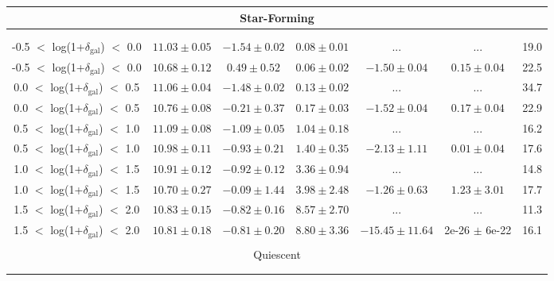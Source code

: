 \documentclass[a4paper,fleqn,usenatbib]{mnras}
\begin{document}
\begin{table*}
\begin{center}
\begin{tabular}{ccccccc}
	\multicolumn{7}{c}{Star-Forming} \\[-0.5mm]
	\hline \\[-5mm]
	\hline \\[-3mm]


    -0.5 $<$ log(1+$\delta_{\mathrm{gal}}$) $<$ 0.0 & $11.03\pm0.05$ & $-1.54\pm0.02$ & $ 0.08\pm0.01$ & ... & ... & 19.0  \\
    -0.5 $<$ log(1+$\delta_{\mathrm{gal}}$) $<$ 0.0 & $10.68\pm0.12$ & $ 0.49\pm0.52$ & $ 0.06\pm0.02$ & $-1.50\pm0.04$ & $ 0.15\pm0.04$ & 22.5  \\[-0.5mm]
    \hline
    0.0 $<$ log(1+$\delta_{\mathrm{gal}}$) $<$ 0.5 & $11.06\pm0.04$ & $-1.48\pm0.02$ & $ 0.13\pm0.02$ & ... & ... & 34.7  \\
    0.0 $<$ log(1+$\delta_{\mathrm{gal}}$) $<$ 0.5 & $10.76\pm0.08$ & $-0.21\pm0.37$ & $ 0.17\pm0.03$ & $-1.52\pm0.04$ & $ 0.17\pm0.04$ & 22.9  \\[-0.5mm]
    \hline
    0.5 $<$ log(1+$\delta_{\mathrm{gal}}$) $<$ 1.0 & $11.09\pm0.08$ & $-1.09\pm0.05$ & $ 1.04\pm0.18$ & ... & ... & 16.2  \\
    0.5 $<$ log(1+$\delta_{\mathrm{gal}}$) $<$ 1.0 & $10.98\pm0.11$ & $-0.93\pm0.21$ & $ 1.40\pm0.35$ & $-2.13\pm1.11$ & $ 0.01\pm0.04$ & 17.6  \\[-0.5mm]
    \hline
    1.0 $<$ log(1+$\delta_{\mathrm{gal}}$) $<$ 1.5 & $10.91\pm0.12$ & $-0.92\pm0.12$ & $ 3.36\pm0.94$ & ... & ... & 14.8  \\
    1.0 $<$ log(1+$\delta_{\mathrm{gal}}$) $<$ 1.5 & $10.70\pm0.27$ & $-0.09\pm1.44$ & $ 3.98\pm2.48$ & $-1.26\pm0.63$ & $ 1.23\pm3.01$ & 17.7  \\[-0.5mm]
    \hline
    1.5 $<$ log(1+$\delta_{\mathrm{gal}}$) $<$ 2.0 & $10.83\pm0.15$ & $-0.82\pm0.16$ & $ 8.57\pm2.70$ & ... & ... & 11.3  \\
    1.5 $<$ log(1+$\delta_{\mathrm{gal}}$) $<$ 2.0 & $10.81\pm0.18$ & $-0.81\pm0.20$ & $ 8.80\pm3.36$ & $-15.45\pm11.64$ & 2e-26 $\pm$ 6e-22 & 16.1  \\[-0.5mm]
	\hline \\[-2.5mm]


	\multicolumn{7}{c}{Quiescent} \\[-0.5mm]
	\hline \\[-5mm]
	\hline \\[-3mm]



\end{tabular}
\end{center}
\end{table*}
\end{document}
